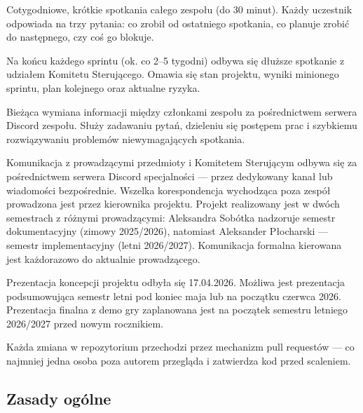 \documentclass[11pt,a4paper]{article}
\begin{document}
\begin{description}[style=nextline]
    \item[Spotkania tygodniowe (stand-upy)]
    Cotygodniowe, krótkie spotkania całego zespołu (do 30 minut). Każdy uczestnik odpowiada na trzy pytania: 
    co zrobił od ostatniego spotkania, co planuje zrobić do następnego, czy coś go blokuje.

    \item[Spotkania etapowe (przeglądy sprintu)]
    Na końcu każdego sprintu (ok. co 2--5 tygodni) odbywa się dłuższe spotkanie z udziałem Komitetu Sterującego. 
    Omawia się stan projektu, wyniki minionego sprintu, plan kolejnego oraz aktualne ryzyka.

    \item[Komunikacja asynchroniczna]
    Bieżąca wymiana informacji między członkami zespołu za pośrednictwem serwera Discord zespołu.
    Służy zadawaniu pytań, dzieleniu się postępem prac i szybkiemu rozwiązywaniu problemów niewymagających spotkania.

    \item[Komunikacja formalna]
    Komunikacja z prowadzącymi przedmioty i Komitetem Sterującym odbywa się za pośrednictwem serwera Discord specjalności --- przez dedykowany kanał lub wiadomości bezpośrednie. Wszelka korespondencja wychodząca poza zespół prowadzona jest przez kierownika projektu. Projekt realizowany jest w dwóch semestrach z różnymi prowadzącymi: Aleksandra Sobótka nadzoruje semestr dokumentacyjny (zimowy 2025/2026), natomiast Aleksander Płocharski --- semestr implementacyjny (letni 2026/2027). Komunikacja formalna kierowana jest każdorazowo do aktualnie prowadzącego.

    \item[Prezentacje]
    Prezentacja koncepcji projektu odbyła się 17.04.2026. Możliwa jest prezentacja
    podsumowująca semestr letni pod koniec maja lub na początku czerwca 2026. Prezentacja
    finalna z demo gry zaplanowana jest na początek semestru letniego 2026/2027 przed nowym
    rocznikiem.

    \item[Przeglądy kodu (\textit{code review})]
    Każda zmiana w repozytorium przechodzi przez mechanizm pull requestów --- co najmniej jedna osoba poza autorem przegląda i zatwierdza kod przed scaleniem.
\end{description}

\subsection{Zasady ogólne}
\end{document}
